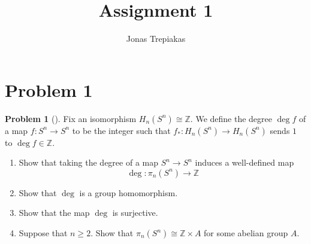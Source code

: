 \documentclass[reqno]{amsart}
\title{Assignment 1}
\author{Jonas Trepiakas}
\date{}
\theoremstyle{definition}
\newtheorem{problem}[theorem]{Problem}
\theoremstyle{remark}
\begin{document}
\maketitle

\section{Problem 1}

    \begin{problem}[]
        Fix an isomorphism $H_n\left( S^{n} \right) \cong \mathbb{Z}$.
        We define the degree $\deg f$ of a map
        $f \colon S^{n} \to S^{n}$ to be the integer such that
        $f_* \colon H_n(S^{n}) \to H_n(S^{n})$ sends $1$ to
        $\deg f \in \mathbb{Z}$.
        \begin{enumerate}
            \item Show that taking the degree of a map
                $S^{n} \to S^{n}$ induces a well-defined
                map
                \[
                \deg \colon \pi_n(S^{n}) \to \mathbb{Z}
                \] 
            \item Show that $\deg $ is a group homomorphism.
            \item Show that the map $\deg$ is surjective.
            \item Suppose that $n\ge 2$. Show that
                $\pi_n\left( S^{n} \right) \cong
                \mathbb{Z} \times A$ for some abelian group $A$.
        \end{enumerate}
    \end{problem}
\end{document}
